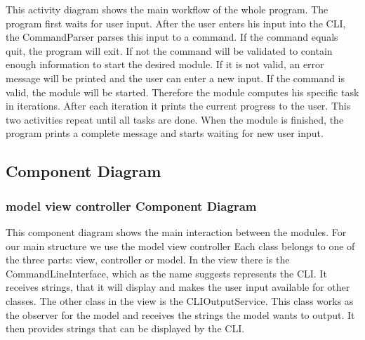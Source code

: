 \documentclass[parskip=full]{scrartcl}
\begin{document}
\begin{figure}[h]
\begin{center}

\label{User Input Activity Diagram}
\end{center}
\end{figure}
\newpage

This activity diagram shows the main workflow of the whole program.
The program first waits for user input.
After the user enters his input into the \gls{CLI}, the CommandParser parses this input to a command.
If the command equals quit, the program will exit.
If not the command will be validated to contain enough information to start the desired module.
If it is not valid, an error message will be printed and the user can enter a new input.
If the command is valid, the module will be started.
Therefore the module computes his specific task in iterations.
After each iteration it prints the current progress to the user.
This two activities repeat until all tasks are done.
When the module is finished, the program prints a complete message and starts waiting for new user input.

\newpage

\subsection{Component Diagram}

\subsubsection{model view controller Component Diagram}

\begin{figure}[h]
\begin{center}

\label{model view controller Component Diagram}
\end{center}
\end{figure}
\newpage

This component diagram shows the main interaction between the modules.
For our main structure we use the model view controller
Each class belongs to one of the three parts: view, controller or model.
In the view there is the CommandLineInterface, which as the name suggests represents the \gls{CLI}.
It receives strings, that it will display and makes the user input available for other classes.
The other class in the view is the CLIOutputService.
This class works as the observer for the model and receives the strings the model wants to output.
It then provides strings that can be displayed by the \gls{CLI}.
\end{document}
